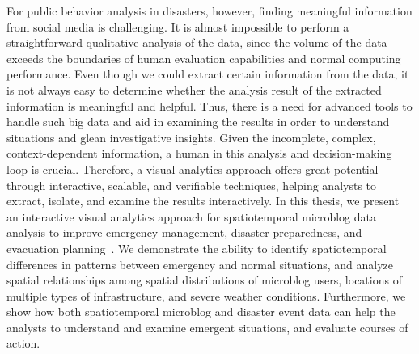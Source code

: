 

For public behavior analysis in disasters, however, finding meaningful information from social media is challenging. It is almost impossible to perform a straightforward qualitative analysis of the data, since the volume of the data exceeds the boundaries of human evaluation capabilities and normal computing performance.
Even though we could extract certain information from the data, it is not always easy to determine whether the analysis result of the extracted information is meaningful and helpful.
Thus, there is a need for advanced tools to handle such big data and aid in examining the results in order to understand situations and glean investigative insights.
Given the incomplete, complex, context-dependent information, a human in this analysis and decision-making loop is crucial.
Therefore, a visual analytics approach offers great potential through interactive, scalable, and verifiable techniques, helping analysts to extract, isolate, and examine the results interactively.
In this thesis, we present an interactive visual analytics approach for spatiotemporal microblog data analysis to improve emergency management, disaster preparedness, and evacuation planning~\cite{Chae:2014:Public}.
We demonstrate the ability to identify spatiotemporal differences in patterns between emergency and normal situations, and analyze spatial relationships among spatial distributions of microblog users, locations of multiple types of infrastructure, and severe weather conditions.
Furthermore, we show how both spatiotemporal microblog and disaster event data can help the analysts to understand and examine emergent situations, and evaluate courses of action.


